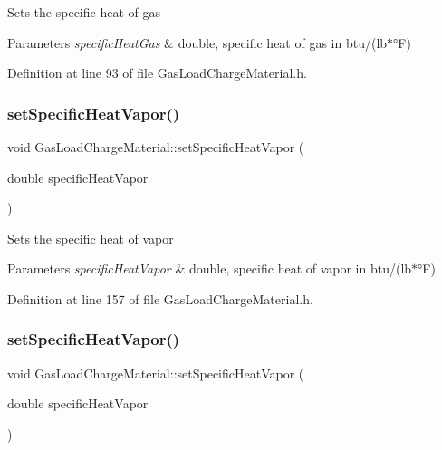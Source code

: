 Sets the specific heat of gas 
\begin{DoxyParams}{Parameters}
{\em specific\+Heat\+Gas} & double, specific heat of gas in btu/(lb$\ast$°F) \\
\hline
\end{DoxyParams}


Definition at line 93 of file Gas\+Load\+Charge\+Material.\+h.

\mbox{\label{class_gas_load_charge_material_a7498eba84bb8bdfc5344f0e44418260b}} 
\subsubsection{\texorpdfstring{set\+Specific\+Heat\+Vapor()}{setSpecificHeatVapor()}\hspace{0.1cm}{\footnotesize\ttfamily [1/3]}}
{\footnotesize\ttfamily void Gas\+Load\+Charge\+Material\+::set\+Specific\+Heat\+Vapor (\begin{DoxyParamCaption}\item[{double}]{specific\+Heat\+Vapor }\end{DoxyParamCaption})\hspace{0.3cm}{\ttfamily [inline]}}

Sets the specific heat of vapor 
\begin{DoxyParams}{Parameters}
{\em specific\+Heat\+Vapor} & double, specific heat of vapor in btu/(lb$\ast$°F) \\
\hline
\end{DoxyParams}


Definition at line 157 of file Gas\+Load\+Charge\+Material.\+h.

\mbox{\label{class_gas_load_charge_material_a7498eba84bb8bdfc5344f0e44418260b}} 
\subsubsection{\texorpdfstring{set\+Specific\+Heat\+Vapor()}{setSpecificHeatVapor()}\hspace{0.1cm}{\footnotesize\ttfamily [2/3]}}
{\footnotesize\ttfamily void Gas\+Load\+Charge\+Material\+::set\+Specific\+Heat\+Vapor (\begin{DoxyParamCaption}\item[{double}]{specific\+Heat\+Vapor }\end{DoxyParamCaption})\hspace{0.3cm}{\ttfamily [inline]}}

